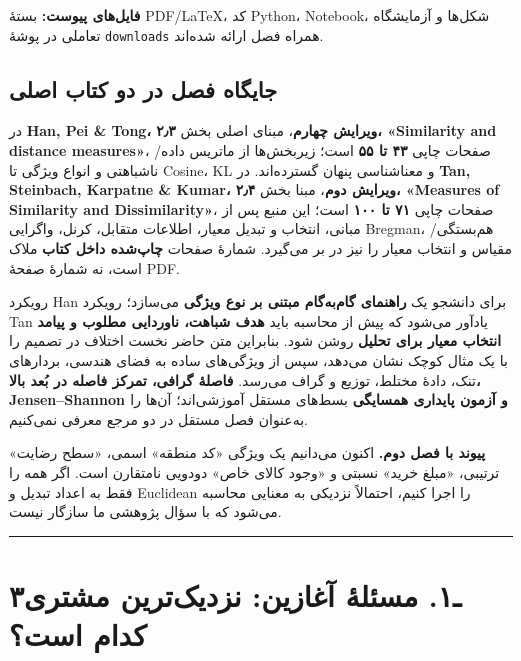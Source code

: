 \documentclass[12pt,a4paper,oneside]{book}
\begin{document}
\textbf{فایل‌های پیوست:} بستهٔ PDF/LaTeX، کد Python، Notebook، شکل‌ها و آزمایشگاه تعاملی در پوشهٔ \texttt{downloads} همراه فصل ارائه شده‌اند.

\subsection{جایگاه فصل در دو کتاب اصلی}\label{ux62cux627ux6ccux6afux627ux647-ux641ux635ux644-ux62fux631-ux62fux648-ux6a9ux62aux627ux628-ux627ux635ux644ux6cc}

در \textbf{Han, Pei \& Tong، ویرایش چهارم}، مبنای اصلی بخش \textbf{۲٫۳، «Similarity and distance measures»}، صفحات چاپی \textbf{۴۳ تا ۵۵} است؛ زیر‌بخش‌ها از ماتریس داده/ناشباهتی و انواع ویژگی تا Cosine، KL و معناشناسی پنهان گسترده‌اند. در \textbf{Tan, Steinbach, Karpatne \& Kumar، ویرایش دوم}، مبنا بخش \textbf{۲٫۴، «Measures of Similarity and Dissimilarity»}، صفحات چاپی \textbf{۷۱ تا ۱۰۰} است؛ این منبع پس از مبانی، انتخاب و تبدیل معیار، اطلاعات متقابل، کرنل، واگرایی Bregman، هم‌بستگی/مقیاس و انتخاب معیار را نیز در بر می‌گیرد. شمارهٔ صفحات \textbf{چاپ‌شده داخل کتاب} ملاک است، نه شمارهٔ صفحهٔ PDF.

رویکرد Han برای دانشجو یک \textbf{راهنمای گام‌به‌گام مبتنی بر نوع ویژگی} می‌سازد؛ رویکرد Tan یادآور می‌شود که پیش از محاسبه باید \textbf{هدف شباهت، ناوردایی مطلوب و پیامد انتخاب معیار برای تحلیل} روشن شود. بنابراین متن حاضر نخست اختلاف در تصمیم را با یک مثال کوچک نشان می‌دهد، سپس از ویژگی‌های ساده به فضای هندسی، بردارهای تنک، دادهٔ مختلط، توزیع و گراف می‌رسد. \textbf{فاصلهٔ گرافی، تمرکز فاصله در بُعد بالا، Jensen--Shannon و آزمون پایداری همسایگی} بسط‌های مستقل آموزشی‌اند؛ آن‌ها را به‌عنوان فصل مستقل در دو مرجع معرفی نمی‌کنیم.

\textbf{پیوند با فصل دوم.} اکنون می‌دانیم یک ویژگی «کد منطقه» اسمی، «سطح رضایت» ترتیبی، «مبلغ خرید» نسبتی و «وجود کالای خاص» دودویی نامتقارن است. اگر همه را فقط به اعداد تبدیل و Euclidean را اجرا کنیم، احتمالاً نزدیکی به معنایی محاسبه می‌شود که با سؤال پژوهشی ما سازگار نیست.

\begin{center}\rule{0.5\linewidth}{0.5pt}\end{center}

\section{۳ـ۱. مسئلهٔ آغازین: نزدیک‌ترین مشتری کدام است؟}\label{ux640ux6f1.-ux645ux633ux626ux644ux647-ux622ux63aux627ux632ux6ccux646-ux646ux632ux62fux6ccux6a9ux62aux631ux6ccux646-ux645ux634ux62aux631ux6cc-ux6a9ux62fux627ux645-ux627ux633ux62a}
\end{document}

